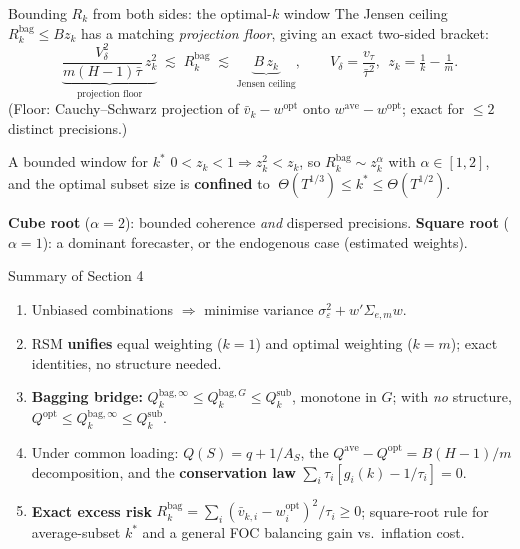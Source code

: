 \documentclass[11pt,aspectratio=169]{beamer}
\newcommand{\Sig}{\Sigma_{e,m}}
\newcommand{\wopt}{w^{\mathrm{opt}}}
\newcommand{\wave}{w^{\mathrm{ave}}}
\newcommand{\Qopt}{Q^{\mathrm{opt}}}
\newcommand{\Qave}{Q^{\mathrm{ave}}}
\newcommand{\Qsub}{Q_k^{\mathrm{sub}}}
\newcommand{\Qbag}{Q_k^{\mathrm{bag},\infty}}
\newcommand{\QbagG}{Q_k^{\mathrm{bag},G}}
\newcommand{\Rk}{R_k^{\mathrm{bag}}}
\begin{document}
\begin{frame}{Bounding $R_k$ from both sides: the optimal-$k$ window}
  The Jensen ceiling $\Rk\le Bz_k$ has a matching \emph{projection floor},
  giving an exact two-sided bracket:
  \[
    \underbrace{\frac{V_\delta^2}{m(H-1)\bar\tau}\,z_k^2}_{\text{projection floor}}
    \;\lesssim\;\Rk\;\lesssim\;
    \underbrace{B\,z_k}_{\text{Jensen ceiling}},
    \qquad V_\delta=\frac{v_\tau}{\bar\tau^2},\ \ z_k=\tfrac1k-\tfrac1m .
  \]
  {\footnotesize (Floor: Cauchy--Schwarz projection of $\bar v_k-\wopt$ onto $\wave-\wopt$; exact for $\le2$ distinct precisions.)}
  \begin{block}{A bounded window for $k^*$}
    $0<z_k<1\Rightarrow z_k^2<z_k$, so $\Rk\sim z_k^\alpha$ with
    $\alpha\in[1,2]$, and the optimal subset size is \textbf{confined} to
    $\;\Theta(T^{1/3})\le k^*\le\Theta(T^{1/2}).$
  \end{block}
  {\footnotesize
  \textbf{Cube root} ($\alpha=2$): bounded coherence \emph{and} dispersed
  precisions.\quad
  \textbf{Square root} ($\alpha=1$): a dominant forecaster, or the endogenous
  case (estimated weights).}
  \vspace{2pt}

  \centering{}
\end{frame}

\begin{frame}{Summary of Section 4}
  \begin{enumerate}
    \item Unbiased combinations $\Rightarrow$ minimise variance
      $\sigma_\varepsilon^2+w'\Sig w$.
    \item RSM \textbf{unifies} equal weighting ($k=1$) and optimal weighting
      ($k=m$); exact identities, no structure needed.
    \item \textbf{Bagging bridge:}
      $\Qbag\le\QbagG\le\Qsub$, monotone in $G$; with \emph{no} structure,
      $\Qopt\le\Qbag\le\Qsub$.
    \item Under common loading: $Q(S)=q+1/A_S$, the
      $\Qave-\Qopt=B(H-1)/m$ decomposition, and the \textbf{conservation law}
      $\sum_i\tau_i[g_i(k)-1/\tau_i]=0$.
    \item \textbf{Exact excess risk}
      $\Rk=\sum_i(\bar v_{k,i}-w_i^{\mathrm{opt}})^2/\tau_i\ge0$;
      square-root rule for average-subset $k^*$ and a general FOC balancing
      gain vs.\ inflation cost.
  \end{enumerate}
  \vfill
  \centering{}
\end{frame}
\end{document}
